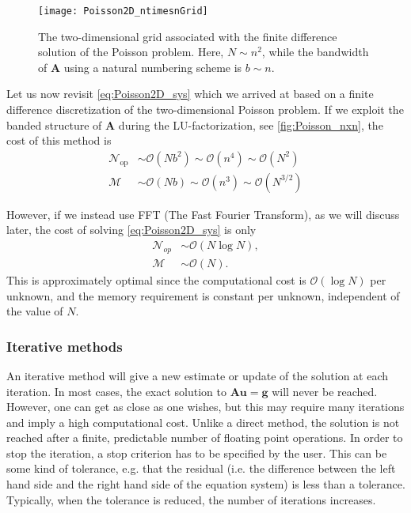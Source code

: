 \begin{figure}
  \centering
  \texttt{[image: Poisson2D\_ntimesnGrid]}
  \caption{
    The two-dimensional grid associated with the finite difference solution of
    the Poisson problem. Here, $N \sim n^2$, while the bandwidth of
    $\bm A$ using a natural numbering scheme is $b\sim n$.
  }
  \label{fig:Poisson_nxn}
\end{figure}

Let us now revisit \eqref{eq:Poisson2D_sys} which we arrived at based on a
finite difference discretization of the two-dimensional Poisson problem. If we
exploit the banded structure of $\bm A$ during the LU-factorization, see
\autoref{fig:Poisson_nxn}, the cost of this method is
\begin{align*}
  \mathcal{N}_\text{op} &\sim \mathcal{O}(N b^2)
                          \sim \mathcal{O}(n^4) \sim \mathcal{O}(N^2)\\
  \mathcal{M} &\sim \mathcal{O}(N b) \sim \mathcal{O}(n^3) \sim \mathcal{O}(N^{3/2})
\end{align*}

However, if we instead use FFT (The Fast Fourier Transform), as we will discuss
later, the cost of solving \eqref{eq:Poisson2D_sys} is only
\begin{align*}
  \mathcal{N}_{op} &\sim \mathcal{O}(N \log N), \\
  \mathcal{M} &\sim \mathcal{O}(N).
\end{align*}
This is approximately optimal since the computational cost is $\mathcal{O}(\log
N)$ per unknown, and the memory requirement is constant per unknown, independent
of the value of $N$.

\subsubsection{Iterative methods}

An iterative method will give a new estimate or update of the solution at each
iteration. In most cases, the exact solution to $\bm A \bm u = \bm g$ will never
be reached. However, one can get as close as one wishes, but this may require
many iterations and imply a high computational cost. Unlike a direct method, the
solution is not reached after a finite, predictable number of floating point
operations. In order to stop the iteration, a stop criterion has to be specified
by the user. This can be some kind of tolerance, e.g. that the residual (i.e.
the difference between the left hand side and the right hand side of the
equation system) is less than a tolerance. Typically, when the tolerance is
reduced, the number of iterations increases.

